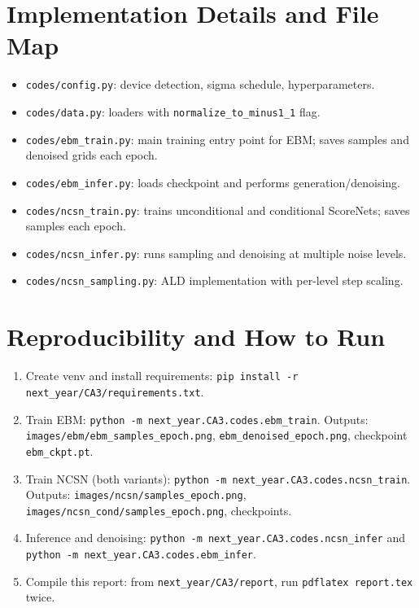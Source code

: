 \documentclass[conference]{IEEEtran}
\begin{document}
\section{Implementation Details and File Map}
\begin{itemize}[leftmargin=*]
    \item \texttt{codes/config.py}: device detection, sigma schedule, hyperparameters.
    \item \texttt{codes/data.py}: loaders with \texttt{normalize\_to\_minus1\_1} flag.
    \item \texttt{codes/ebm\_train.py}: main training entry point for EBM; saves samples and denoised grids each epoch.
    \item \texttt{codes/ebm\_infer.py}: loads checkpoint and performs generation/denoising.
    \item \texttt{codes/ncsn\_train.py}: trains unconditional and conditional ScoreNets; saves samples each epoch.
    \item \texttt{codes/ncsn\_infer.py}: runs sampling and denoising at multiple noise levels.
    \item \texttt{codes/ncsn\_sampling.py}: ALD implementation with per-level step scaling.
\end{itemize}

\section{Reproducibility and How to Run}
\label{sec:repro}
\begin{enumerate}[leftmargin=*]
    \item Create venv and install requirements: \texttt{pip install -r next\_year/CA3/requirements.txt}.
    \item Train EBM: \texttt{python -m next\_year.CA3.codes.ebm\_train}. Outputs: \texttt{images/ebm/ebm\_samples\_epoch\*.png}, \texttt{ebm\_denoised\_epoch\*.png}, checkpoint \texttt{ebm\_ckpt.pt}.
    \item Train NCSN (both variants): \texttt{python -m next\_year.CA3.codes.ncsn\_train}. Outputs: \texttt{images/ncsn/samples\_epoch\*.png}, \texttt{images/ncsn\_cond/samples\_epoch\*.png}, checkpoints.
    \item Inference and denoising: \texttt{python -m next\_year.CA3.codes.ncsn\_infer} and \texttt{python -m next\_year.CA3.codes.ebm\_infer}.
    \item Compile this report: from \texttt{next\_year/CA3/report}, run \texttt{pdflatex report.tex} twice.
\end{enumerate}
\end{document}
